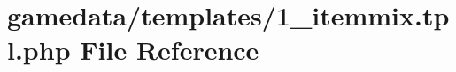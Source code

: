 \hypertarget{1__itemmix_8tpl_8php}{\section{gamedata/templates/1\+\_\+itemmix.tpl.\+php File Reference}
\label{1__itemmix_8tpl_8php}
}
